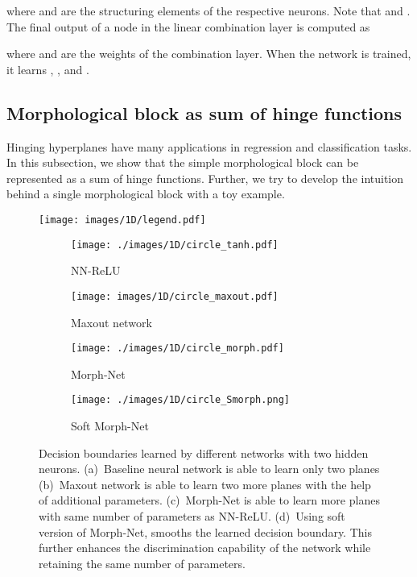 \documentclass[12pt]{article}
\begin{document}
where  and  are the structuring elements of the respective neurons. Note that  and . The final output of a node in the linear combination layer is computed as 

where  and  are the weights of the combination layer. When the network is trained, it learns , ,  and . 

\subsection{Morphological block as sum of hinge functions}
Hinging hyperplanes \cite{breiman1993hinging} have many applications in regression and classification tasks. In this subsection, we show that the simple morphological block can be represented as a sum of hinge functions. Further, we try to develop the intuition behind a single morphological block with a toy example. 

\begin{figure*}
    \centering
    \texttt{[image: images/1D/legend.pdf]}
    
    \smallskip
    \begin{subfigure}[t]{0.247\linewidth}
        \texttt{[image: ./images/1D/circle\_tanh.pdf]}
        \caption{NN-ReLU}
        \label{fig:decision_nn}
    \end{subfigure}
    \begin{subfigure}[t]{0.24\linewidth}
        \texttt{[image: images/1D/circle\_maxout.pdf]}
        \caption{Maxout network}
        \label{fig:decision_maxout}
    \end{subfigure}
    \begin{subfigure}[t]{0.216\linewidth}
        \texttt{[image: ./images/1D/circle\_morph.pdf]}
        \caption{Morph-Net}
        \label{fig:decision_morph}
    \end{subfigure}
    \begin{subfigure}[t]{0.2175\linewidth}
        \texttt{[image: ./images/1D/circle\_Smorph.png]}
        \caption{Soft Morph-Net}
        \label{fig:decision_morph_soft}
    \end{subfigure}
\caption{Decision boundaries learned by different networks with two hidden neurons. (a)~Baseline neural network is able to learn only two planes
(b)~Maxout network 
is able to learn two more planes with the help of additional parameters. 
(c)~Morph-Net is able to learn more planes with same number of parameters as NN-ReLU. 
(d)~Using soft version of Morph-Net, smooths the learned decision boundary. 
This further enhances the discrimination capability of the network while retaining the same number of parameters.}
    \label{fig:pmap_circle}
\end{figure*}
\end{document}
